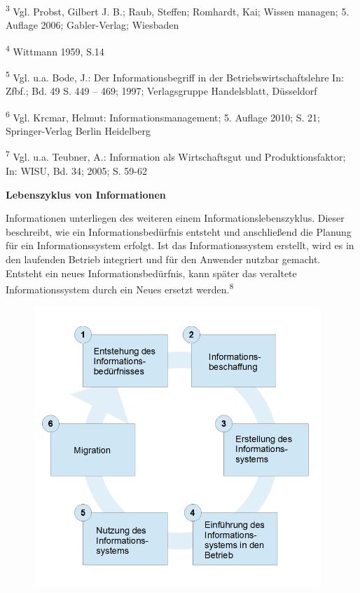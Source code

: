 \documentclass[a4paper]{article}
\begin{document}
\bigskip


\bigskip


\bigskip

{\sffamily\color{black}
\newline
\textsuperscript{3} Vgl. Probst, Gilbert J. B.; Raub, Steffen; Romhardt, Kai; Wissen managen; 5. Auflage 2006;
Gabler-Verlag; Wiesbaden}

{\sffamily\color{black}
\textsuperscript{4} Wittmann 1959, S.14}

{\sffamily\color{black}
\textsuperscript{5} Vgl. u.a. Bode, J.: Der Informationsbegriff in der Betriebswirtschaftslehre In: Zfbf.; Bd. 49 S. 449
– 469; 1997; Verlagsgruppe Handelsblatt, Düsseldorf}

{\sffamily\color{black}
\textsuperscript{6} Vgl. Krcmar, Helmut: Informationsmanagement; 5. Auflage 2010; S. 21; Springer-Verlag Berlin
Heidelberg}

{\sffamily\color{black}
\textsuperscript{7} Vgl. u.a. Teubner, A.: Information als Wirtschaftsgut und Produktionsfaktor; In: WISU, Bd. 34; 2005;
S. 59-62 }

{\sffamily\bfseries\color{black}
Lebenszyklus von Informationen}

{\sffamily\color{black}
Informationen unterliegen des weiteren einem Informationslebenszyklus. Dieser beschreibt, wie ein Informationsbedürfnis
entsteht und anschließend die Planung für ein Informationssystem erfolgt. Ist das Informationssystem erstellt, wird es
in den laufenden Betrieb integriert und für den Anwender nutzbar gemacht. Entsteht ein neues Informationsbedürfnis,
kann später das veraltete Informationssystem durch ein Neues ersetzt werden.\textsuperscript{8}}


\bigskip



\begin{figure}
\centering
\includegraphics[width=10.851cm,height=10.608cm]{ErsteVersionderHausarbeit11Boris-img/ErsteVersionderHausarbeit11Boris-img001.png}
\end{figure}
\end{document}
